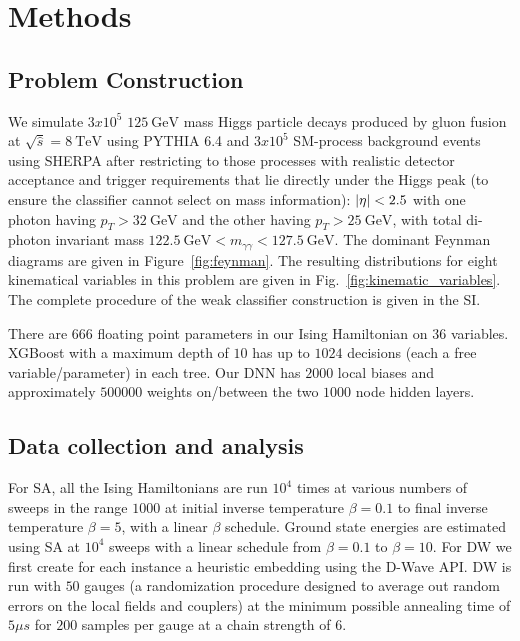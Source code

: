 \documentclass[fleqn,10pt]{wlscirep}
\begin{document}
\FloatBarrier
\newpage\newpage
\FloatBarrier
\clearpage

\section*{Methods}

\subsection*{Problem Construction}
We simulate $3x10^5$ $\SI{125}{\giga\electronvolt}$ mass Higgs particle decays produced by gluon fusion at $\sqrt{\hat{s}} = \SI{8}{\tera\electronvolt}$ using PYTHIA 6.4 \cite{Pythia:2006} and $3x10^5$ SM-process background events using SHERPA \cite{Sherpa:2009} after restricting to those processes with realistic detector acceptance and trigger requirements that lie directly under the Higgs peak (to ensure the classifier cannot select on mass information): $\abs{\eta}<2.5$ with one photon having $p_T>\SI{32}{\giga\electronvolt}$ and the other having $p_T>\SI{25}{\giga\electronvolt}$, with total di-photon invariant mass $\SI{122.5}{\giga\electronvolt} < m_{\gamma\gamma} < \SI{127.5}{\giga\electronvolt}$. The dominant Feynman diagrams 
are given in Figure~\ref{fig:feynman}. The resulting distributions for eight kinematical variables in this problem are given in Fig.~\ref{fig:kinematic_variables}. The complete procedure of the weak classifier construction is given in the SI.

There are $666$ floating point parameters in our Ising Hamiltonian on $36$ variables. XGBoost with a maximum depth of $10$ has up to $1024$ decisions (each a free variable/parameter) in each tree. Our DNN has $2000$ local biases and approximately $500000$ weights on/between the two $1000$ node hidden layers. 



\subsection*{Data collection and analysis}
For SA, all the Ising Hamiltonians are run $10^4$ times at various numbers of sweeps in the range $1000$ at initial inverse temperature $\beta=0.1$ to final inverse temperature $\beta=5$, with a linear $\beta$ schedule. Ground state energies are  estimated using SA at $10^4$ sweeps with a linear schedule from $\beta=0.1$ to $\beta=10$.
For DW we first create for each instance a heuristic embedding using the D-Wave API.  DW is run with $50$ gauges \cite{q-sig2} (a randomization procedure designed
to average out random errors on the local fields and couplers) at the minimum possible annealing time of $5\mu s$ for $200$ samples per gauge at a chain strength of $6$. 
\end{document}
